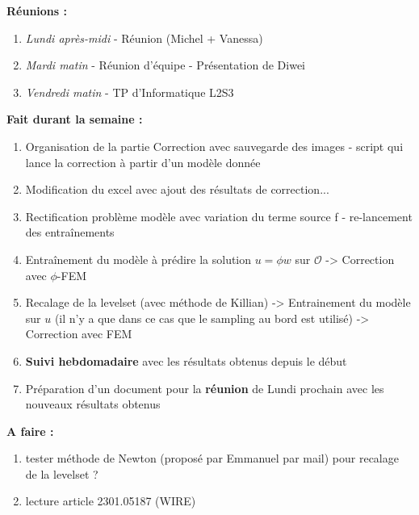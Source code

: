 \textbf{Réunions :}
\begin{enumerate}[label=\textbullet]
	\item \textit{Lundi après-midi} - Réunion (Michel + Vanessa)
	\item \textit{Mardi matin} - Réunion d'équipe - Présentation de Diwei
	\item \textit{Vendredi matin} - TP d'Informatique L2S3
\end{enumerate}
\textbf{Fait durant la semaine :}
\begin{enumerate}[label=\textbullet]
	\item Organisation de la partie Correction avec sauvegarde des images - script qui lance la correction à partir d’un modèle donnée
	\item Modification du excel avec ajout des résultats de correction...
	\item Rectification problème modèle avec variation du terme source f - re-lancement des entraînements
	\item Entraînement du modèle à prédire la solution $u=\phi w$ sur $\mathcal{O}$ -> Correction avec $\phi$-FEM
	\item Recalage de la levelset (avec méthode de Killian) -> Entrainement du modèle sur $u$ (il n'y a que dans ce cas que le sampling au bord est utilisé) -> Correction avec FEM
	\item \textbf{Suivi hebdomadaire} avec les résultats obtenus depuis le début
	\item Préparation d'un document pour la \textbf{réunion} de Lundi prochain avec les nouveaux résultats obtenus
\end{enumerate}

\textbf{A faire :}
\begin{enumerate}[label=\textbullet]
	\item tester méthode de Newton (proposé par Emmanuel par mail) pour recalage de la levelset ?
	\item lecture article 2301.05187 (WIRE)
\end{enumerate}